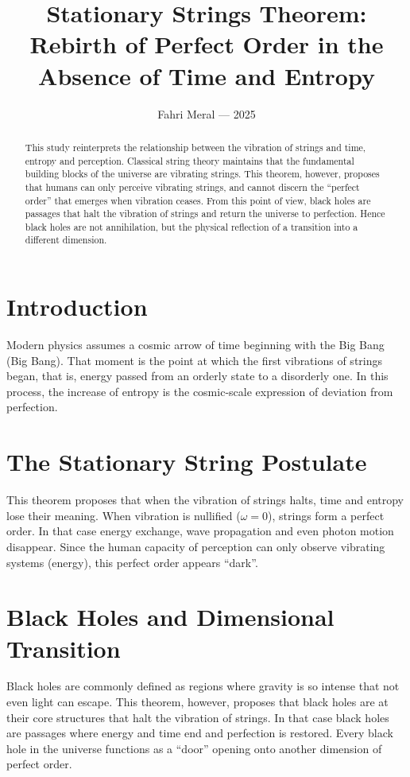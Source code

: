 \documentclass[12pt]{article}
\title{\textbf{Stationary Strings Theorem: Rebirth of Perfect Order in the Absence of Time and Entropy}}
\author{Fahri Meral --- 2025}
\date{}
\begin{document}
\maketitle

\begin{abstract}
This study reinterprets the relationship between the vibration of strings and time, entropy and perception.
Classical string theory maintains that the fundamental building blocks of the universe are vibrating strings.
This theorem, however, proposes that humans can only perceive vibrating strings, and cannot discern the
``perfect order'' that emerges when vibration ceases.
From this point of view, black holes are passages that halt the vibration of strings and return the universe to perfection.
Hence black holes are not annihilation, but the physical reflection of a transition into a different dimension.
\end{abstract}

\section{Introduction}
Modern physics assumes a cosmic arrow of time beginning with the Big Bang (Big Bang).
That moment is the point at which the first vibrations of strings began, that is, energy passed from an orderly state to a disorderly one.
In this process, the increase of entropy is the cosmic-scale expression of deviation from perfection.

\section{The Stationary String Postulate}
This theorem proposes that when the vibration of strings halts, time and entropy lose their meaning.
When vibration is nullified ($\omega = 0$), strings form a perfect order.
In that case energy exchange, wave propagation and even photon motion disappear.
Since the human capacity of perception can only observe vibrating systems (energy), this perfect order appears ``dark''.

\section{Black Holes and Dimensional Transition}
Black holes are commonly defined as regions where gravity is so intense that not even light can escape.
This theorem, however, proposes that black holes are at their core structures that halt the vibration of strings.
In that case black holes are passages where energy and time end and perfection is restored.
Every black hole in the universe functions as a ``door'' opening onto another dimension of perfect order.
\end{document}
